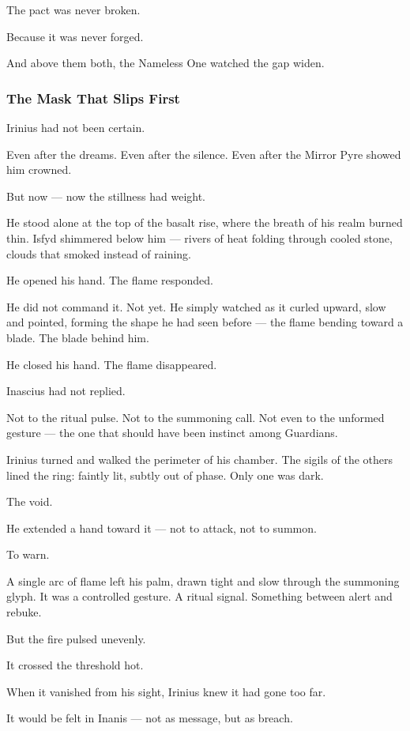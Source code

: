 \documentclass[12pt]{article}
\begin{document}
The pact was never broken.

Because it was never forged.

And above them both, the Nameless One watched the gap widen.


\dotfill

\subsubsection{The Mask That Slips First}

Irinius had not been certain.

Even after the dreams. Even after the silence. Even after the Mirror Pyre showed him crowned.

But now — now the stillness had weight.

He stood alone at the top of the basalt rise, where the breath of his realm burned thin. Isfyd shimmered below him — rivers of heat folding through cooled stone, clouds that smoked instead of raining.

He opened his hand. The flame responded.

He did not command it. Not yet. He simply watched as it curled upward, slow and pointed, forming the shape he had seen before — the flame bending toward a blade. The blade behind him.

He closed his hand. The flame disappeared.

Inascius had not replied.

Not to the ritual pulse. Not to the summoning call. Not even to the unformed gesture — the one that should have been instinct among Guardians.

Irinius turned and walked the perimeter of his chamber. The sigils of the others lined the ring: faintly lit, subtly out of phase. Only one was dark.

The void.

He extended a hand toward it — not to attack, not to summon.

To warn.

A single arc of flame left his palm, drawn tight and slow through the summoning glyph. It was a controlled gesture. A ritual signal. Something between alert and rebuke.

But the fire pulsed unevenly.

It crossed the threshold hot.

When it vanished from his sight, Irinius knew it had gone too far.

It would be felt in Inanis — not as message, but as breach.
\end{document}
